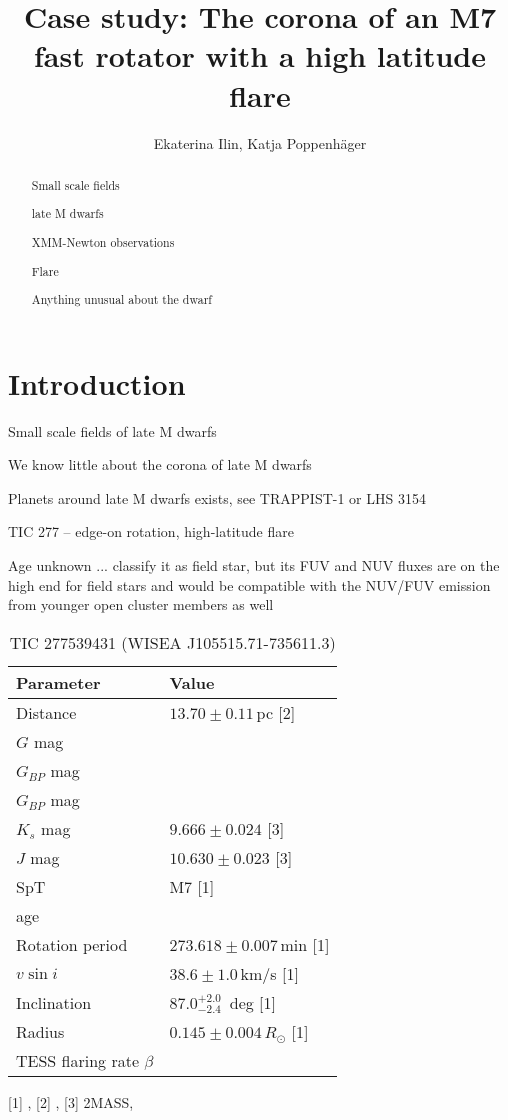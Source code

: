 \documentclass[twocolumn]{aastex631}
\begin{document}
\title{Case study: The corona of an M7 fast rotator with a high latitude flare}

\author{Ekaterina Ilin, Katja Poppenh\"ager}


\begin{abstract}
    Small scale fields

    late M dwarfs

    XMM-Newton observations

    Flare

    Anything unusual about the dwarf
    
\end{abstract}

\section{Introduction}
\label{sec:intro}

Small scale fields of late M dwarfs

We know little about the corona of late M dwarfs

Planets around late M dwarfs exists, see TRAPPIST-1 or LHS 3154~\citep{stefansson2023extreme}

TIC 277 -- edge-on rotation, high-latitude flare

Age unknown ... \citep{schneider2018hazmat} classify it as field star, but its FUV and NUV fluxes are on the high end for field stars and would be compatible with the NUV/FUV emission from younger open cluster members as well


\begin{table}

    \caption{TIC 277539431 (WISEA J105515.71-735611.3)}
    \begin{tabular}{ll}\hline 
         Parameter & Value  \\\hline
         Distance & $13.70\pm0.11\,$pc [2] \\
         $G$ mag & \\
         $G_{BP}$ mag & \\
         $G_{BP}$ mag & \\
         $K_s$ mag & $9.666 \pm 0.024$ [3]\\
         $J$ mag & $10.630 \pm 0.023$ [3] \\
         SpT & M7 [1]\\
         age & \\
         Rotation period & $273.618 \pm 0.007\,$min [1]\\
         $v\sin i$ & $38.6\pm1.0\,$km/s [1] \\
         Inclination & $87.0^{+2.0}_{-2.4}\,$ deg [1]\\
         Radius & $0.145\pm0.004\,R_\odot$ [1]\\
         TESS flaring rate $\beta$ &  \\\hline
        
    \end{tabular}
    \newline\footnotesize
    [1] \citet{ilin2021giant}, [2] \citet{bailer-jones2018estimating}, [3] 2MASS, \citet{skrutskie2006two}
    \label{tab:modelparams}
\end{table}
\end{document}
